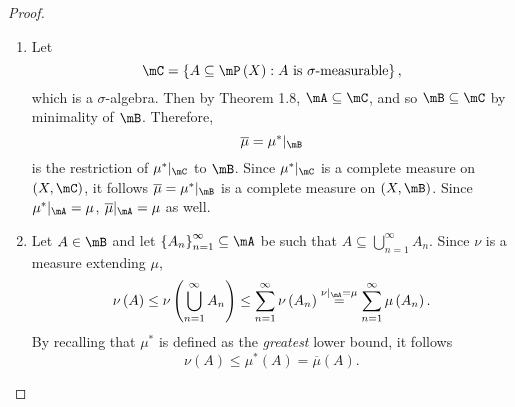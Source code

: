 \documentclass[pmath451]{subfiles}
\begin{document}
    \begin{proof}
        \begin{enumerate}
            \item Let
                \begin{equation*}
                    \mC = \left\lbrace A\subseteq\mP\left( X \right) : \text{$A$ is $\sigma$-measurable} \right\rbrace,
                \end{equation*}
                which is a $\sigma$-algebra. Then by Theorem 1.8, $\mA\subseteq\mC$, and so $\mB\subseteq\mC$ by minimality of $\mB$. Therefore,
                \begin{equation*}
                    \overline{\mu} = \mu^{*}|_{\mB}
                \end{equation*}
                is the restriction of $\mu^{*}|_{\mC}$ to $\mB$. Since $\mu^{*}|_{\mC}$ is a complete measure on $\left( X,\mC \right)$, it follows $\overline{\mu} = \mu^{*}|_{\mB}$ is a complete measure on $\left( X,\mB \right)$. Since $\mu^{*}|_{\mA} = \mu$, $\overline{\mu}|_{\mA} = \mu$ as well.

            \item Let $A\in\mB$ and let $\left\lbrace A_n \right\rbrace^{\infty}_{n=1}\subseteq\mA$ be such that $A\subseteq\bigcup^{\infty}_{n=1}A_n$. Since $\nu$ is a measure extending $\mu$,
                \begin{equation*}
                    \nu\left( A \right)\leq\nu\left( \bigcup^{\infty}_{n=1}A_n \right) \leq \sum^{\infty}_{n=1} \nu\left( A_n \right) \overset{\nu|_{\mA}=\mu}{=} \sum^{\infty}_{n=1} \mu\left( A_n \right).
                \end{equation*}
                By recalling that $\mu^{*}$ is defined as the \textit{greatest} lower bound, it follows
                \begin{equation*}
                    \nu\left( A \right)\leq\mu^{*}\left( A \right)=\overline{\mu}\left( A \right).
                \end{equation*}


\end{enumerate}
\end{proof}
\end{document}
